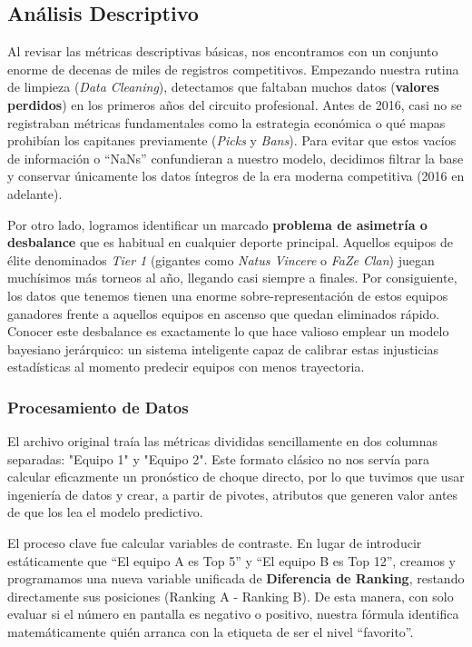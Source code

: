 \documentclass[twocolumn,10pt]{article}
\begin{document}
\subsection{Análisis Descriptivo}
Al revisar las métricas descriptivas básicas, nos encontramos con un conjunto enorme de decenas de miles de registros competitivos. Empezando nuestra rutina de limpieza (\textit{Data Cleaning}), detectamos que faltaban muchos datos (\textbf{valores perdidos}) en los primeros años del circuito profesional. Antes de 2016, casi no se registraban métricas fundamentales como la estrategia económica o qué mapas prohibían los capitanes previamente (\textit{Picks} y \textit{Bans}). Para evitar que estos vacíos de información o ``NaNs'' confundieran a nuestro modelo, decidimos filtrar la base y conservar únicamente los datos íntegros de la era moderna competitiva (2016 en adelante).

Por otro lado, logramos identificar un marcado \textbf{problema de asimetría o desbalance} que es habitual en cualquier deporte principal. Aquellos equipos de élite denominados \textit{Tier 1} (gigantes como \textit{Natus Vincere} o \textit{FaZe Clan}) juegan muchísimos más torneos al año, llegando casi siempre a finales. Por consiguiente, los datos que tenemos tienen una enorme sobre-representación de estos equipos ganadores frente a aquellos equipos en ascenso que quedan eliminados rápido. Conocer este desbalance es exactamente lo que hace valioso emplear un modelo bayesiano jerárquico: un sistema inteligente capaz de calibrar estas injusticias estadísticas al momento predecir equipos con menos trayectoria.

\subsubsection{Procesamiento de Datos}
El archivo original traía las métricas divididas sencillamente en dos columnas separadas: "Equipo 1" y "Equipo 2". Este formato clásico no nos servía para calcular eficazmente un pronóstico de choque directo, por lo que tuvimos que usar ingeniería de datos y crear, a partir de pivotes, atributos que generen valor antes de que los lea el modelo predictivo.

El proceso clave fue calcular variables de contraste. En lugar de introducir estáticamente que ``El equipo A es Top 5'' y ``El equipo B es Top 12'', creamos y programamos una nueva variable unificada de \textbf{Diferencia de Ranking}, restando directamente sus posiciones (Ranking A - Ranking B). De esta manera, con solo evaluar si el número en pantalla es negativo o positivo, nuestra fórmula identifica matemáticamente quién arranca con la etiqueta de ser el nivel ``favorito''. 
\end{document}
